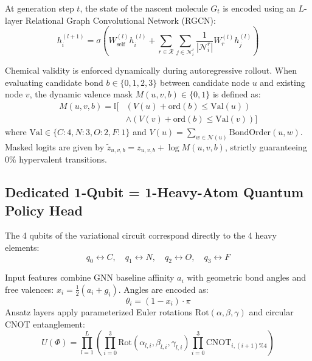 \documentclass[10pt,twocolumn,a4paper]{article}
\begin{document}
At generation step $t$, the state of the nascent molecule $G_t$ is encoded using an $L$-layer Relational Graph Convolutional Network (RGCN):
\begin{equation}
h_i^{(l+1)} = \sigma \left( W_{\text{self}}^{(l)} h_i^{(l)} + \sum_{r \in \mathcal{R}} \sum_{j \in \mathcal{N}_i^r} \frac{1}{|\mathcal{N}_i^r|} W_r^{(l)} h_j^{(l)} \right)
\end{equation}

Chemical validity is enforced dynamically during autoregressive rollout. When evaluating candidate bond $b \in \{0, 1, 2, 3\}$ between candidate node $u$ and existing node $v$, the dynamic valence mask $M(u, v, b) \in \{0, 1\}$ is defined as:
\begin{equation}
\begin{aligned}
M(u, v, b) = \mathbb{I} \Big[ & \left(V(u) + \text{ord}(b) \le \text{Val}(u)\right) \\
& \land \left(V(v) + \text{ord}(b) \le \text{Val}(v)\right) \Big]
\end{aligned}
\end{equation}
where $\text{Val} \in \{C: 4, N: 3, O: 2, F: 1\}$ and $V(u) = \sum_{w \in \mathcal{N}(u)} \text{BondOrder}(u, w)$. Masked logits are given by $\tilde{z}_{u,v,b} = z_{u,v,b} + \log M(u, v, b)$, strictly guaranteeing $0\%$ hypervalent transitions.

\subsection{Dedicated 1-Qubit = 1-Heavy-Atom Quantum Policy Head}
The 4 qubits of the variational circuit correspond directly to the 4 heavy elements:
\begin{equation}
q_0 \leftrightarrow C, \quad q_1 \leftrightarrow N, \quad q_2 \leftrightarrow O, \quad q_3 \leftrightarrow F
\end{equation}

Input features combine GNN baseline affinity $a_i$ with geometric bond angles and free valences: $x_i = \frac{1}{2}(a_i + g_i)$. Angles are encoded as:
\begin{equation}
\theta_i = (1 - x_i) \cdot \pi
\end{equation}
Ansatz layers apply parameterized Euler rotations $\text{Rot}(\alpha, \beta, \gamma)$ and circular CNOT entanglement:
\begin{equation}
U(\Phi) = \prod_{l=1}^L \left( \prod_{i=0}^3 \text{Rot}(\alpha_{l,i}, \beta_{l,i}, \gamma_{l,i}) \prod_{i=0}^3 \text{CNOT}_{i, (i+1)\%4} \right)
\end{equation}
\end{document}
